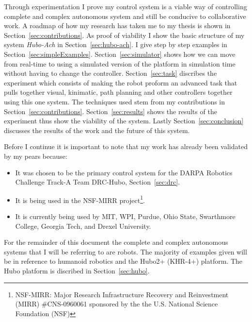 Through experimentation I prove my control system is a viable way of controlling complete and complex autonomous system and still be conducive to collaborative work.  
A roadmap of how my research has taken me to my thesis is shown in Section~\ref{sec:contributions}.
As proof of viability I show the basic structure of my system \textit{Hubo-Ach} in Section~\ref{sec:hubo-ach}\cite{lofaroRAM2013}.  
I give step by step examples in Section~\ref{sec:simpleExamples}.
Section~\ref{sec:simulator} shows how we can move from real-time to using a simulated version of the platform in simulation time without having to change the controller.
Section~\ref{sec:task} discribes the experiment which consists of making the robot proform an advanced task that pulls together visual, kinimatic, path planning and other controllers together using this one system.
The techniques used stem from my contributions in Section~\ref{sec:contributions}.
Section~\ref{sec:results} shows the results of the experiment thus show the viability of the system.
Lastly Section~\ref{sec:conclusion} discusses the results of the work and the future of this system.

Before I continue it is important to note that my work has already been validated by my pears because:
\begin{itemize}
\item It was chosen to be the primary control system for the DARPA Robotics Challenge Track-A Team DRC-Hubo, Section~\ref{sec:drc}.
\item It is being used in the NSF-MIRR project\footnote{NSF-MIRR: Major Research Infrastructure Recovery and Reinvestment (MIRR) \#CNS-0960061 sponsored by the the U.S. National Science Foundation (NSF)}.
\item It is currently being used by MIT, WPI, Purdue, Ohio State, Swarthmore College, Georgia Tech, and Drexel University.
\end{itemize}

For the remainder of this document the complete and complex autonomous systems that I will be referring to are robots.
The majority of examples given will be in reference to humanoid robotics and the Hubo2+ (KHR-4+) platform.
The Hubo platform is discribed in Section~\ref{sec:hubo}.









